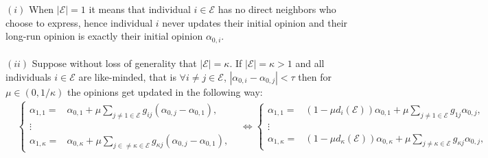 \documentclass{article}
\begin{document}
$(i)$ When $|\mathcal{E}|=1$ it means that individual $i \in \mathcal{E}$ has no direct neighbors who choose to express, hence individual $i$ never updates their initial opinion and their long-run opinion is exactly their initial opinion $\alpha_{0,i}$. \\ \\ $(ii)$ Suppose without loss of generality that $|\mathcal{E}| = \kappa$. If $|\mathcal{E}| = \kappa >1$ and all individuals $i \in \mathcal{E}$ are like-minded, that is $\forall i \neq j \in \mathcal{E}$, $ | \alpha_{0,i} - \alpha_{0,j}| < \tau$ then for $\mu \in (0,1/\kappa)$ the opinions get updated in the following way:
\begin{align*}
&\left\{ \begin{aligned}
\alpha_{1,1} = & \alpha_{0,1} + \mu  \sum_{j  \neq 1 \in \mathcal{E} } g_{ij} (\alpha_{0,j} - \alpha_{0,1}), \\
\vdots & \\
\alpha_{1,\kappa} = & \alpha_{0,\kappa} + \mu  \sum_{j \in \neq \kappa \in \mathcal{E} } g_{\kappa j}(\alpha_{0,j} - \alpha_{0,1}),
\end{aligned} \right. & \Leftrightarrow \left\{\begin{aligned}
\alpha_{1,1} = & (1 -  \mu d_i (\mathcal{E}) ) \alpha_{0,1} + \mu  \sum_{j \neq 1 \in \mathcal{E} } g_{1j} \alpha_{0,j},  \\
\vdots & \\
\alpha_{1,\kappa} = & (1 -  \mu d_{\kappa} (\mathcal{E})   ) \alpha_{0,\kappa} + \mu  \sum_{j \neq \kappa \in \mathcal{E} } g_{\kappa j} \alpha_{0,j},
\end{aligned} \right. 
\end{align*}
\end{document}
